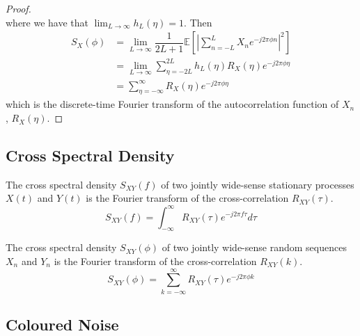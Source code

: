 \documentclass[11pt]{report} %
\begin{document}
\begin{proof}
\begin{equation}
\end{equation}
where we have that $\lim_{L\to\infty}h_{L}\left(\eta\right) = 1$. Then
\begin{align}
S_{X}\left(\phi\right) &= \lim_{L\to\infty}\dfrac{1}{2L+1}\mathbb{E}\left[\left|\sum_{n=-L}^{L}X_{n}e^{-j2\pi\phi n}\right|^{2}\right] \\
&= \lim_{L\to\infty}\sum_{\eta=-2L}^{2L}h_{L}\left(\eta\right)R_{X}\left(\eta\right)e^{-j2\pi\phi\eta} \\
&= \sum_{\eta=-\infty}^{\infty}R_{X}\left(\eta\right)e^{-j2\pi\phi\eta}
\end{align}
which is the discrete-time Fourier transform of the autocorrelation function of $X_{n}$, $R_{X}\left(\eta\right)$.
\end{proof}

\subsection{Cross Spectral Density}

The cross spectral density $S_{XY}\left(f\right)$ of two jointly wide-sense stationary processes $X\left(t\right)$ and $Y\left(t\right)$ is the Fourier transform of the cross-correlation $R_{XY}\left(\tau\right)$.
\begin{equation}
S_{XY}\left(f\right) = \int_{-\infty}^{\infty}R_{XY}\left(\tau\right)e^{-j2\pi f\tau}d\tau
\end{equation}

The cross spectral density $S_{XY}\left(\phi\right)$ of two jointly wide-sense random sequences $X_{n}$ and $Y_{n}$ is the Fourier transform of the cross-correlation $R_{XY}\left(k\right)$.
\begin{equation}
S_{XY}\left(\phi\right) = \sum_{k = -\infty}^{\infty}R_{XY}\left(\tau\right)e^{-j2\pi \phi k}
\end{equation}

\subsection{Coloured Noise}
\end{document}
